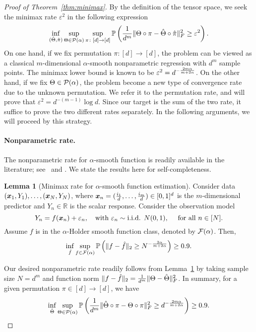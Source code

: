 \documentclass[11pt]{article}
\theoremstyle{definition}
\newtheorem{lem}[thm]{Lemma}
\begin{document}
\begin{proof}[Proof of Theorem~\ref{thm:minimax}] By the definition of the tensor space, we seek the minimax rate $\varepsilon^2$ in the following expression
\begin{equation}\label{eq:final}
\inf_{(\hat \Theta,\hat \pi)}\sup_{\Theta\in \mathcal{P}(\alpha)}\sup_{\pi\colon [d]\to[d]} \mathbb{P}\left({1\over d^m}\lVert\Theta\circ \pi-\hat \Theta\circ \hat \pi\rVert_F^2 \geq \varepsilon^2 \right).
\end{equation}
On one hand, if we fix permutation $\pi\colon[d]\to[d]$, the problem can be viewed as a classical $m$-dimensional $\alpha$-smooth nonparametric regression with $d^m$ sample points. The minimax lower bound is known to be $\varepsilon^2=d^{-{2m\alpha\over m+2\alpha}}$. On the other hand, if we fix $\Theta\in\mathcal{P}(\alpha)$, the problem become a new type of convergence rate due to the unknown permutation. We refer it to the permutation rate, and will prove that $\varepsilon^2=d^{-(m-1)}\log d$. Since our target is the sum of the two rate, it suffice to prove the two different rates separately. In the following arguments, we will proceed by this strategy. 

\paragraph{Nonparametric rate.} The nonparametric rate for $\alpha$-smooth function is readily available in the literature; see \citet[Lecture note, Example 16]{Wassermantext}~and \citet[Section 2]{stone1982optimal}. We state the results here for self-completeness. 

\begin{lem}[Minimax rate for $\alpha$-smooth function estimation]\label{lem:non} Consider data $(\bm x_1,Y_1), \ldots, (\bm x_N,Y_N)$, where $\bm x_n=({i_1\over d},\ldots,{i_m\over d})\in[0,1]^d$ is the $m$-dimensional predictor and $Y_n\in\mathbb{R}$ is the scalar response. Consider the observation model
\[
Y_n=f(\mx_n)+\varepsilon_n,\quad \text{with}\ \varepsilon_n \sim \text{i.i.d. }  N(0,1), \quad\text{ for all }n\in[N].
\]
Assume $f$ is in the $\alpha$-Holder smooth function class, denoted by $\mathcal{F}(\alpha)$. Then,
\begin{equation}\label{eq:non}
\inf_{\hat f}\sup_{f\in \mathcal{F}(\alpha)}\mathbb{P}\left(\lVert f-\hat f\rVert_2\geq N^{-{2\alpha\over m+2\alpha}}\right)\geq 0.9.
\end{equation}
\end{lem}
Our desired nonparametric rate readily follows from Lemma~\ref{lem:non} by taking sample size $N=d^m$ and function norm $\lVert f-\hat f\rVert_2={1\over d^m}\lVert\Theta-\hat \Theta\rVert_F^2$. In summary, for a given permutation $\pi\in[d]\to[d]$, we have
\[
\inf_{\hat \Theta}\sup_{\Theta\in \mathcal{P}(\alpha)}\mathbb{P}\left({1\over d^m}\lVert\hat \Theta\circ \pi-\Theta\circ \pi\rVert_F^2\geq d^{-{2m\alpha\over m+2\alpha}}\right) \geq 0.9.
\]




\end{proof}
\end{document}
